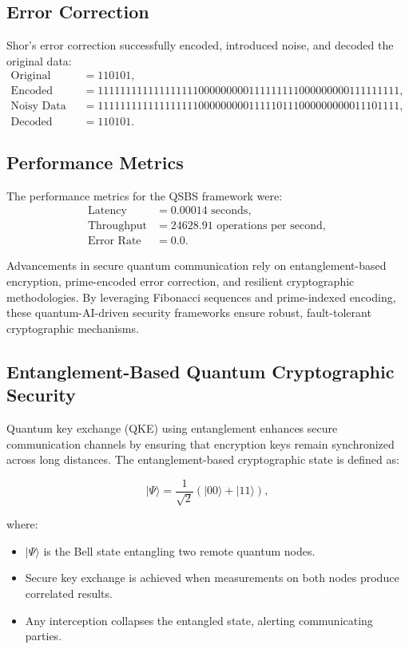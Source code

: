 \documentclass{article}
\theoremstyle{plain}
\begin{document}
\begin{itemize}
\begin{itemize}
\subsection{Error Correction}
Shor's error correction successfully encoded, introduced noise, and decoded the original data:
\begin{align*}
\text{Original Data} &= 110101, \\
\text{Encoded Data} &= 111111111111111111000000000111111111000000000111111111, \\
\text{Noisy Data} &= 111111111111111111000000000111110111000000000011101111, \\
\text{Decoded Data} &= 110101.
\end{align*}

\subsection{Performance Metrics}
The performance metrics for the QSBS framework were:
\begin{align*}
\text{Latency} &= 0.00014 \text{ seconds}, \\
\text{Throughput} &= 24628.91 \text{ operations per second}, \\
\text{Error Rate} &= 0.0.
\end{align*}


Advancements in secure quantum communication rely on entanglement-based encryption, prime-encoded error correction, and resilient cryptographic methodologies. By leveraging Fibonacci sequences and prime-indexed encoding, these quantum-AI-driven security frameworks ensure robust, fault-tolerant cryptographic mechanisms.

\subsection{Entanglement-Based Quantum Cryptographic Security}

Quantum key exchange (QKE) using entanglement enhances secure communication channels by ensuring that encryption keys remain synchronized across long distances. The entanglement-based cryptographic state is defined as:

\begin{equation}
|\Psi\rangle = \frac{1}{\sqrt{2}} (|00\rangle + |11\rangle),
\end{equation}

where:
\begin{itemize}
    \item $|\Psi\rangle$ is the Bell state entangling two remote quantum nodes.
    \item Secure key exchange is achieved when measurements on both nodes produce correlated results.
    \item Any interception collapses the entangled state, alerting communicating parties.
\end{itemize}


\end{itemize}
\end{itemize}
\end{document}
